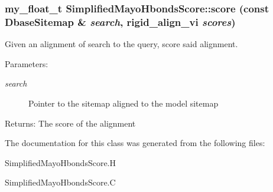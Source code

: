 \subsubsection{\setlength{\rightskip}{0pt plus 5cm}my\_\-float\_\-t Simplified\-Mayo\-Hbonds\-Score::score (const \bf{Dbase\-Sitemap} \& {\em search}, rigid\_\-align\_\-vi {\em scores})\hspace{0.3cm}{\tt  [protected]}}\label{classSimSite3D_1_1SimplifiedMayoHbondsScore_855918f5ffd04e320e9270f07878fc75}


Given an alignment of search to the query, score said alignment. 

\begin{Desc}
\item[Parameters:]
\begin{description}
\item[{\em search}]Pointer to the sitemap aligned to the model sitemap \end{description}
\end{Desc}
\begin{Desc}
\item[Returns:]The score of the alignment \end{Desc}


The documentation for this class was generated from the following files:\begin{CompactItemize}
\item 
Simplified\-Mayo\-Hbonds\-Score.H\item 
Simplified\-Mayo\-Hbonds\-Score.C\end{CompactItemize}
